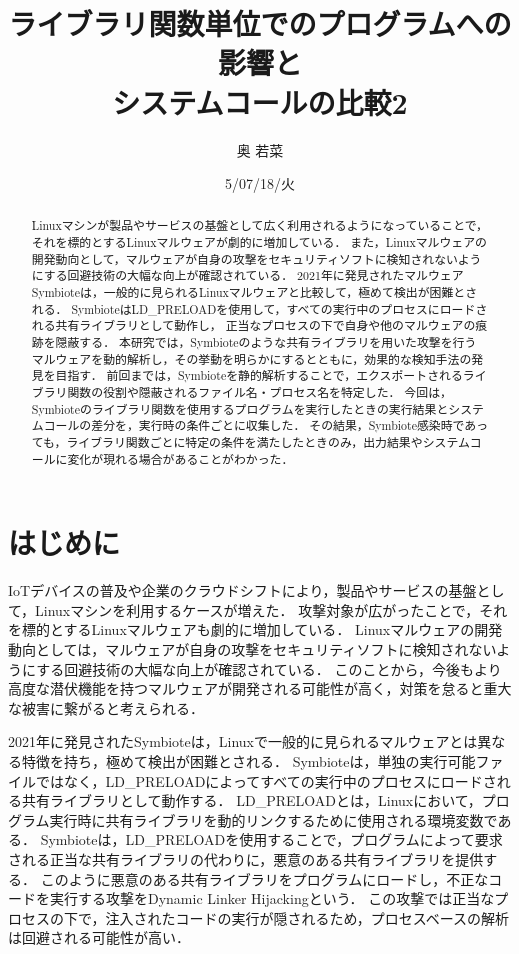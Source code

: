 \documentclass[submit,techreq,noauthor]{eco}	%
\begin{document}
\date   {5/07/18/火}				%
\title  {ライブラリ関数単位でのプログラムへの影響と\\システムコールの比較2}	%
\author {奥 若菜}				%


\begin{abstract}
	Linuxマシンが製品やサービスの基盤として広く利用されるようになっていることで，それを標的とするLinuxマルウェアが劇的に増加している．
  また，Linuxマルウェアの開発動向として，マルウェアが自身の攻撃をセキュリティソフトに検知されないようにする回避技術の大幅な向上が確認されている．
  2021年に発見されたマルウェアSymbioteは，一般的に見られるLinuxマルウェアと比較して，極めて検出が困難とされる．
  SymbioteはLD\_PRELOADを使用して，すべての実行中のプロセスにロードされる共有ライブラリとして動作し，
  正当なプロセスの下で自身や他のマルウェアの痕跡を隠蔽する．
  本研究では，Symbioteのような共有ライブラリを用いた攻撃を行うマルウェアを動的解析し，その挙動を明らかにするとともに，効果的な検知手法の発見を目指す．
  前回までは，Symbioteを静的解析することで，エクスポートされるライブラリ関数の役割や隠蔽されるファイル名・プロセス名を特定した．
  今回は，Symbioteのライブラリ関数を使用するプログラムを実行したときの実行結果とシステムコールの差分を，実行時の条件ごとに収集した．
  その結果，Symbiote感染時であっても，ライブラリ関数ごとに特定の条件を満たしたときのみ，出力結果やシステムコールに変化が現れる場合があることがわかった．
\end{abstract}
\maketitle


\section{はじめに}
IoTデバイスの普及や企業のクラウドシフトにより，製品やサービスの基盤として，Linuxマシンを利用するケースが増えた．
攻撃対象が広がったことで，それを標的とするLinuxマルウェアも劇的に増加している\cite{TREND-MICRO}．
Linuxマルウェアの開発動向としては，マルウェアが自身の攻撃をセキュリティソフトに検知されないようにする回避技術の大幅な向上が確認されている\cite{IBM}．
このことから，今後もより高度な潜伏機能を持つマルウェアが開発される可能性が高く，対策を怠ると重大な被害に繋がると考えられる．


2021年に発見されたSymbioteは，Linuxで一般的に見られるマルウェアとは異なる特徴を持ち，極めて検出が困難とされる\cite{Symbiote}．
Symbioteは，単独の実行可能ファイルではなく，LD\_PRELOADによってすべての実行中のプロセスにロードされる共有ライブラリとして動作する．
LD\_PRELOADとは，Linuxにおいて，プログラム実行時に共有ライブラリを動的リンクするために使用される環境変数である．
Symbioteは，LD\_PRELOADを使用することで，プログラムによって要求される正当な共有ライブラリの代わりに，悪意のある共有ライブラリを提供する．
このように悪意のある共有ライブラリをプログラムにロードし，不正なコードを実行する攻撃をDynamic Linker Hijackingという\cite{MITRE-ATT&CK}．
この攻撃では正当なプロセスの下で，注入されたコードの実行が隠されるため，プロセスベースの解析は回避される可能性が高い．
\end{document}
